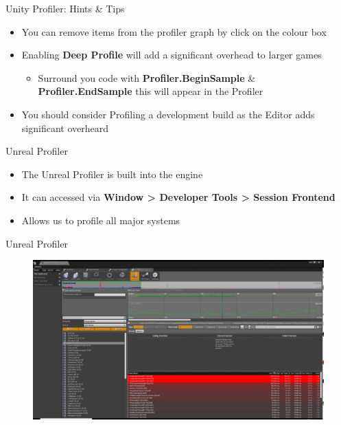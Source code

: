 \begin{frame}{Unity Profiler: Hints \& Tips}
	\begin{itemize}
		\pause \item You can remove items from the profiler graph by click on the colour box
		\pause \item Enabling \textbf{Deep Profile} will add a significant overhead to larger games
		\begin{itemize}
			\pause \item Surround you code with \textbf{Profiler.BeginSample} \& \textbf{Profiler.EndSample} this will appear in the Profiler
		\end{itemize}
		\pause \item You should consider Profiling a development build as the Editor adds significant overheard
	\end{itemize}
\end{frame}

\begin{frame}{Unreal Profiler}
	\begin{itemize}
		\pause \item The Unreal Profiler is built into the engine
		\pause \item It can accessed via \textbf{Window > Developer Tools > Session Frontend}
		\pause \item Allows us to profile all major systems
	\end{itemize}
\end{frame}

\begin{frame}{Unreal Profiler}
	\begin{figure}
		\includegraphics[width=1.0\textwidth,height=0.8\textheight]{UnrealProfilerWindow}  
	\end{figure}
\end{frame}